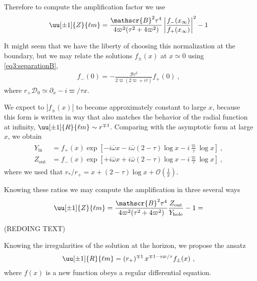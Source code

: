 Therefore to compute the amplification factor we use
\begin{align}
	\uu[\pm 1]{Z}{\ell m} = \frac{\mathscr{B}^2 \tau^4 }{4 \varpi^2 (\tau^2 + 4 \varpi^2)} \left| \frac{f_{-}(x_\infty)}{f_{+}(x_\infty)} \right|^2 - 1
\end{align}

It might seem that we have the liberty of choosing this normalization at the boundary, but we may relate the solutions $f_{\pm}(x)$ at $x\simeq0$ using \eqref{eq3:separationB},
\begin{align}
	f_{-}(0) = -\frac{\mathscr{B} \tau^2 }{2 \varpi ( 2 \varpi + i \tau) } f_{+}(0) ~,
\end{align}
where $r_{+} \mathscr{D}_0 \simeq \partial_x - i \varpi / \tau x$.

We expect to $|f_\pm(x)|$ to become approximately constant to large $x$, because this
form is written in way that also matches the behavior of the radial function at infinity, $\uu[\pm 1]{R}{\ell m}\sim r^{\mp 1}$.
Comparing  with the asymptotic form at large $x$, we obtain
\begin{align}
	\begin{split}
	Y_\mathrm{in} &= f_{+}(x) \exp\left[ - i \bar{\omega} x - i \bar{\omega} (2-\tau)\log x   -i \frac{\varpi}{\tau} \log x \right] ~, \\
	Z_\mathrm{out} &= f_{-}(x) \exp\left[ + i \bar{\omega} x + i \bar{\omega} (2-\tau)\log x   -i \frac{\varpi}{\tau} \log x \right] ~,
	\end{split}
\end{align}
where we used that $r_{*}/r_{+} = x + (2-\tau)\log x + \mathscr{O}(\tfrac{1}{x})$.




Knowing these ratios we may compute the amplification in three several ways
\begin{align}
	\uu[\pm 1]{Z}{\ell m} = \frac{\mathscr{B}^2 \tau^4}{4 \varpi^2 (\tau^2 + 4 \varpi^2)} \frac{Z_\mathrm{out}}{Y_\mathrm{hole}} - 1 =  
\end{align}

(REDOING TEXT)

Knowing the irregularities of the solution at the horizon, we propose the ansatz
\begin{align}
	\uu[\pm 1]{R}{\ell m} = (r_+)^{\mp 1} \, x^{ \mp 1 - i \varpi / \tau} f_{\pm}(x) ~,
\end{align}
where $f(x)$ is a new function obeys a regular differential equation.

